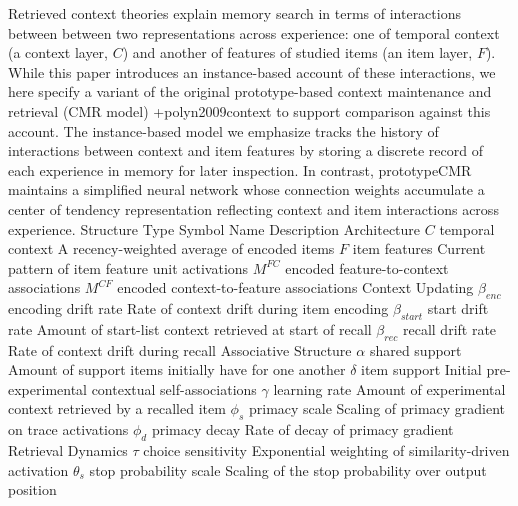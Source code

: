 \markdownRendererInterblockSeparator
{}Retrieved context theories explain memory search in terms of interactions between between two representations across experience: one of temporal context (a context layer, $C$) and another of features of studied items (an item layer, $F$). While this paper introduces an instance-based account of these interactions, we here specify a variant of the original prototype-based context maintenance and retrieval (CMR model) +{}{}{polyn2009context} to support comparison against this account. The instance-based model we emphasize tracks the history of interactions between context and item features by storing a discrete record of each experience in memory for later inspection. In contrast, prototypeCMR maintains a simplified neural network whose connection weights accumulate a center of tendency representation reflecting context and item interactions across experience. \markdownRendererInterblockSeparator
{}%
{{Structure Type}%
{Symbol}%
{Name}%
{Description}%
}%
{{Architecture}%
{}%
{}%
{}%
}%
{{}%
{$C$}%
{temporal context}%
{A recency-weighted average of encoded items}%
}%
{{}%
{$F$}%
{item features}%
{Current pattern of item feature unit activations}%
}%
{{}%
{$M^{FC}$}%
{}%
{encoded feature-to-context associations}%
}%
{{}%
{$M^{CF}$}%
{}%
{encoded context-to-feature associations}%
}%
{{Context Updating}%
{}%
{}%
{}%
}%
{{}%
{${\beta}_{enc}$}%
{encoding drift rate}%
{Rate of context drift during item encoding}%
}%
{{}%
{${\beta}_{start}$}%
{start drift rate}%
{Amount of start-list context retrieved at start of recall}%
}%
{{}%
{${\beta}_{rec}$}%
{recall drift rate}%
{Rate of context drift during recall}%
}%
{{Associative Structure}%
{}%
{}%
{}%
}%
{{}%
{${\alpha}$}%
{shared support}%
{Amount of support items initially have for one another}%
}%
{{}%
{${\delta}$}%
{item support}%
{Initial pre-experimental contextual self-associations}%
}%
{{}%
{${\gamma}$}%
{learning rate}%
{Amount of experimental context retrieved by a recalled item}%
}%
{{}%
{${\phi}_{s}$}%
{primacy scale}%
{Scaling of primacy gradient on trace activations}%
}%
{{}%
{${\phi}_{d}$}%
{primacy decay}%
{Rate of decay of primacy gradient}%
}%
{{Retrieval Dynamics}%
{}%
{}%
{}%
}%
{{}%
{${\tau}$}%
{choice sensitivity}%
{Exponential weighting of similarity-driven activation}%
}%
{{}%
{${\theta}_{s}$}%
{stop probability scale}%
{Scaling of the stop probability over output position}%
}%
